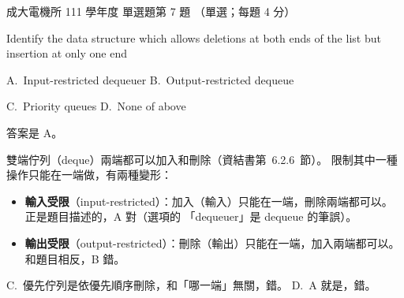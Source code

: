 \begin{pastexam}[label={px:ncku-111-ee-ds-07}]{成大電機所 111 學年度 單選題第 7 題}
（單選；每題 4 分）

Identify the data structure which allows deletions at both ends of the list but insertion at only one end

A.~Input-restricted dequeuer \qquad B.~Output-restricted dequeue

C.~Priority queues \qquad D.~None of above
\end{pastexam}

\begin{pastsoln}
答案是 A。

雙端佇列（deque）兩端都可以加入和刪除（資結書第~6.2.6~節）。 限制其中一種操作只能在一端做，有兩種變形：
\begin{itemize}
\item \textbf{輸入受限}（input-restricted）：加入（輸入）只能在一端，刪除兩端都可以。 正是題目描述的，A 對（選項的
「dequeuer」是 dequeue 的筆誤）。
\item \textbf{輸出受限}（output-restricted）：刪除（輸出）只能在一端，加入兩端都可以。 和題目相反，B 錯。
\end{itemize}
C.~優先佇列是依優先順序刪除，和「哪一端」無關，錯。 D.~A 就是，錯。
\end{pastsoln}
